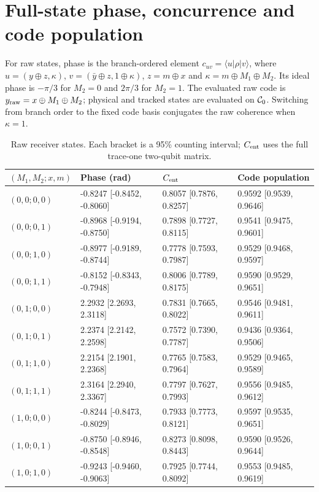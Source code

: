 \documentclass[10pt,a4paper]{article}
\begin{document}
\section{Full-state phase, concurrence and code population}
For raw states, phase is the branch-ordered element $c_{uv}=\langle u|\rho|v\rangle$, where
$u=(y\oplus z,\kappa)$, $v=(\bar y\oplus z,1\oplus\kappa)$,
$z=m\oplus x$ and $\kappa=m\oplus M_1\oplus M_2$. Its ideal phase is $-\pi/3$ for $M_2=0$ and $2\pi/3$ for $M_2=1$. The evaluated raw code is $y_{\rm raw}=x\oplus M_1\oplus M_2$; physical and tracked states are evaluated on $\mathcal C_0$. Switching from branch order to the fixed code basis conjugates the raw coherence when $\kappa=1$.
\par\begin{table}[htbp]\centering\small
\caption{Raw receiver states. Each bracket is a 95\% counting interval; $C_{\rm ent}$ uses the full trace-one two-qubit matrix.}\label{stab:state_raw}
\begin{tabular}{llll}\toprule
$(M_1,M_2;x,m)$ & Phase (rad) & $C_{\rm ent}$ & Code population\\\midrule
$(0,0;0,0)$ & -0.8247 [-0.8452, -0.8060] & 0.8057 [0.7876, 0.8257] & 0.9592 [0.9539, 0.9646] \\
$(0,0;0,1)$ & -0.8968 [-0.9194, -0.8750] & 0.7898 [0.7727, 0.8115] & 0.9541 [0.9475, 0.9601] \\
$(0,0;1,0)$ & -0.8977 [-0.9189, -0.8744] & 0.7778 [0.7593, 0.7987] & 0.9529 [0.9468, 0.9597] \\
$(0,0;1,1)$ & -0.8152 [-0.8343, -0.7948] & 0.8006 [0.7789, 0.8175] & 0.9590 [0.9529, 0.9651] \\
$(0,1;0,0)$ & 2.2932 [2.2693, 2.3118] & 0.7831 [0.7665, 0.8022] & 0.9546 [0.9481, 0.9611] \\
$(0,1;0,1)$ & 2.2374 [2.2142, 2.2598] & 0.7572 [0.7390, 0.7787] & 0.9436 [0.9364, 0.9506] \\
$(0,1;1,0)$ & 2.2154 [2.1901, 2.2368] & 0.7765 [0.7583, 0.7964] & 0.9529 [0.9465, 0.9589] \\
$(0,1;1,1)$ & 2.3164 [2.2940, 2.3367] & 0.7797 [0.7627, 0.7993] & 0.9556 [0.9485, 0.9612] \\
$(1,0;0,0)$ & -0.8244 [-0.8473, -0.8029] & 0.7933 [0.7773, 0.8121] & 0.9597 [0.9535, 0.9651] \\
$(1,0;0,1)$ & -0.8750 [-0.8946, -0.8548] & 0.8273 [0.8098, 0.8443] & 0.9590 [0.9526, 0.9644] \\
$(1,0;1,0)$ & -0.9243 [-0.9460, -0.9063] & 0.7925 [0.7744, 0.8092] & 0.9553 [0.9485, 0.9619] \\

\end{tabular}
\end{table}
\end{document}
